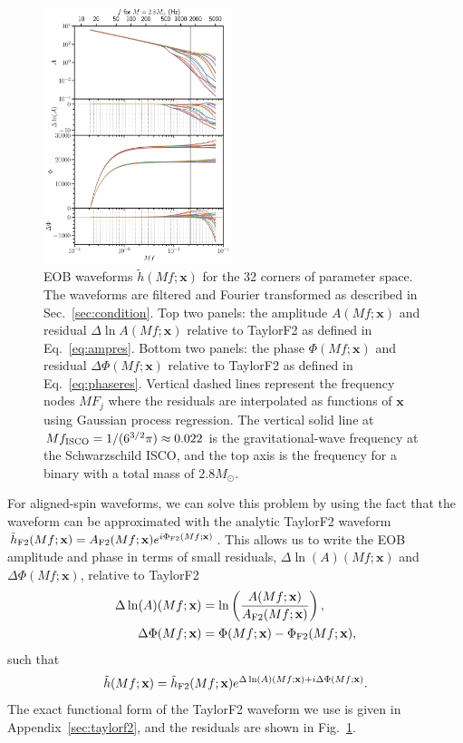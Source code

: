 \documentclass[prd,aps,letter,twocolumn,floatfix,notitlepage,nofootinbib]{revtex4-1}
\def\bx{\mathbf{x}}
\begin{document}
\begin{figure}[htb]
\centering
\includegraphics[width=0.49\textwidth]{hoff.pdf}
\caption{EOB waveforms $\tilde h(Mf; \bx)$ for the 32 corners of parameter space. The waveforms are filtered and Fourier transformed as described in Sec.~\ref{sec:condition}. Top two panels: the amplitude $A(Mf; \bx)$ and residual $\Delta\ln A(Mf; \bx)$ relative to TaylorF2 as defined in Eq.~\eqref{eq:ampres}. Bottom two panels: the phase $\Phi(Mf; \bx)$ and residual $\Delta\Phi(Mf; \bx)$ relative to TaylorF2 as defined in Eq.~\eqref{eq:phaseres}. Vertical dashed lines represent the frequency nodes $MF_j$ where the residuals are interpolated as functions of $\bx$ using Gaussian process regression. The vertical solid line at $Mf_{\rm ISCO} = 1/(6^{3/2}\pi) \approx 0.022$ is the gravitational-wave frequency at the Schwarzschild ISCO, and the top axis is the frequency for a binary with a total mass of $2.8M_\odot$.}
\label{fig:hoff}
\end{figure}

For aligned-spin waveforms, we can solve this problem by using the fact that the waveform can be approximated with the analytic TaylorF2 waveform $\tilde h_{\rm F2}(Mf; \bx) = A_{\rm F2}(Mf; \bx) e^{i\Phi_{\rm F2} (Mf; \bx)}$. This allows us to write the EOB amplitude and phase in terms of small residuals, $\Delta\ln(A)(Mf; \bx)$ and $\Delta\Phi(Mf; \bx)$, relative to TaylorF2
\begin{align}
\Delta\ln(A)(Mf; \bx) &= \ln\left(\frac{ A(Mf; \bx) }{ A_{\rm F2}(Mf; \bx)}\right), \label{eq:ampres}\\
\Delta\Phi(Mf; \bx) & = \Phi(Mf; \bx) - \Phi_{\rm F2}(Mf; \bx), \label{eq:phaseres}
\end{align}
such that
\begin{align}
\tilde h(Mf; \bx) = \tilde h_{\rm F2}(Mf; \bx) e^{\Delta\ln(A)(Mf; \bx) + i  \Delta\Phi(Mf; \bx)}.
\label{eq:hdecomp}
\end{align}
The exact functional form of the TaylorF2 waveform we use is given in Appendix~\ref{sec:taylorf2}, and the residuals are shown in Fig.~\ref{fig:hoff}. 
\end{document}
